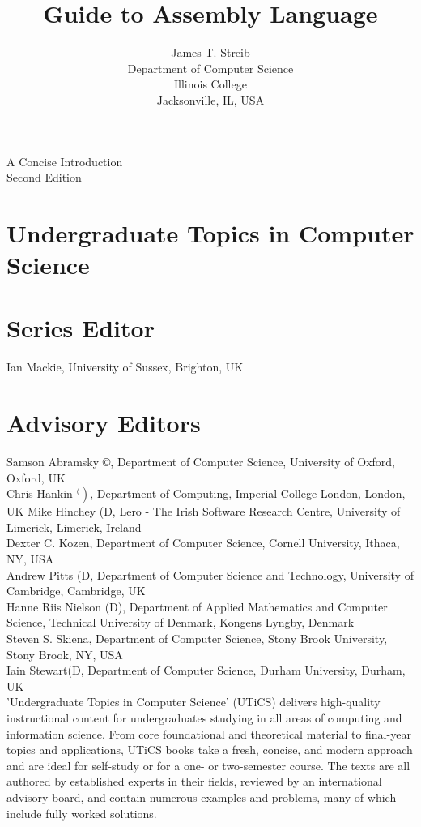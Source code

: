 \documentclass[10pt]{article}
\title{Guide to Assembly Language }
\author{James T. Streib\\
Department of Computer Science\\
Illinois College\\
Jacksonville, IL, USA}
\date{}
\begin{document}
\maketitle
\captionsetup{singlelinecheck=false}


A Concise Introduction\\
Second Edition

\section*{Undergraduate Topics in Computer Science}
\section*{Series Editor}
Ian Mackie, University of Sussex, Brighton, UK

\section*{Advisory Editors}
Samson Abramsky ©, Department of Computer Science, University of Oxford, Oxford, UK\\
Chris Hankin $\left.{ }^{( }\right)$, Department of Computing, Imperial College London, London, UK Mike Hinchey (D, Lero - The Irish Software Research Centre, University of Limerick, Limerick, Ireland\\
Dexter C. Kozen, Department of Computer Science, Cornell University, Ithaca, NY, USA\\
Andrew Pitts (D, Department of Computer Science and Technology, University of Cambridge, Cambridge, UK\\
Hanne Riis Nielson (D), Department of Applied Mathematics and Computer Science, Technical University of Denmark, Kongens Lyngby, Denmark\\
Steven S. Skiena, Department of Computer Science, Stony Brook University, Stony Brook, NY, USA\\
Iain Stewart(D, Department of Computer Science, Durham University, Durham, UK\\
'Undergraduate Topics in Computer Science' (UTiCS) delivers high-quality instructional content for undergraduates studying in all areas of computing and information science. From core foundational and theoretical material to final-year topics and applications, UTiCS books take a fresh, concise, and modern approach and are ideal for self-study or for a one- or two-semester course. The texts are all authored by established experts in their fields, reviewed by an international advisory board, and contain numerous examples and problems, many of which include fully worked solutions.
\end{document}
